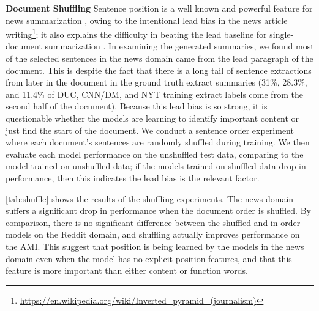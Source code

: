 \textbf{Document Shuffling} Sentence position is a well known and 
powerful feature for news summarization \cite{hong2014improving}, owing 
to the intentional lead bias in the news article writing\footnote{\url{https://en.wikipedia.org/wiki/Inverted_pyramid_(journalism)}}; it also explains the difficulty in beating
the lead baseline for single-document summarization 
\cite{nenkova2005automatic,rau:1999}.
In examining the generated summaries, we found
most of the selected sentences in the news domain came from the lead paragraph
of the document. This is despite the fact that there is a long tail of 
sentence extractions from later in the document in the ground truth extract 
summaries (31\%, 28.3\%, and 11.4\% of DUC, CNN/DM, and NYT training extract labels come 
from the second half of the document). 
Because this lead bias is so strong, it is questionable whether
the models are learning to identify important content or just find the start
of the document. We conduct a sentence order experiment where 
each document's sentences are randomly shuffled during training. We then
evaluate each model performance on the unshuffled test data, comparing to 
the model trained on unshuffled data; if the models trained on shuffled data
drop in performance, then this indicates the lead bias is the relevant factor.

\autoref{tab:shuffle} shows the results
of the shuffling experiments. 
The news domain suffers a significant drop in performance 
when the document order is shuffled. By comparison, there is no significant difference between the shuffled and in-order models on 
the Reddit domain, and shuffling actually improves performance on the AMI.
This suggest that position 
is being learned by the models in the news domain even when the model 
has no explicit position features, and that this feature is more important 
than either content or function words.





%

